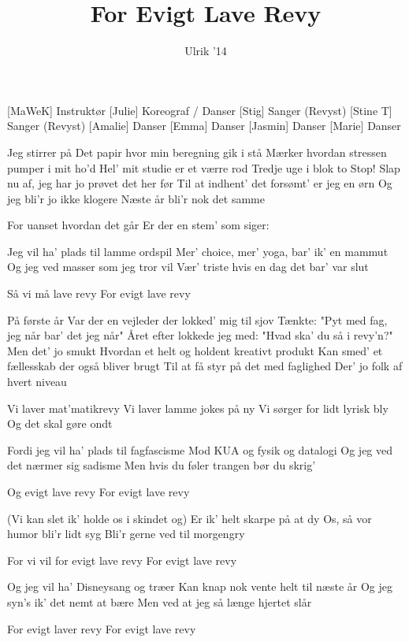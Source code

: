 \documentclass[a4paper,11pt]{article}
\title{For Evigt Lave Revy}
\author{Ulrik '14}
\begin{document}
\maketitle

\begin{roles}
[MaWeK] Instruktør
[Julie] Koreograf / Danser
[Stig] Sanger (Revyst)
[Stine T] Sanger (Revyst)
[Amalie] Danser
[Emma] Danser
[Jasmin] Danser
[Marie] Danser
\end{roles}

\begin{song}
 Jeg stirrer på
Det papir hvor min beregning gik i stå
Mærker hvordan stressen pumper i mit ho'd
Hel' mit studie er et værre rod
Tredje uge i blok to
Stop! Slap nu af, jeg har jo prøvet det her før
Til at indhent' det forsømt' er jeg en ørn
Og jeg bli'r jo ikke klogere
Næste år bli'r nok det samme

 For uanset hvordan det går
Er der en stem' som siger:

 Jeg vil ha' plads til lamme ordspil
Mer' choice, mer' yoga, bar' ik' en mammut
Og jeg ved masser som jeg tror vil
Vær' triste hvis en dag det bar' var slut

 Så vi må lave revy
For evigt lave revy

 På første år
Var der en vejleder der lokked' mig til sjov
Tænkte: "Pyt med fag, jeg når bar' det jeg når"
Året efter lokkede jeg med:
"Hvad ska' du så i revy'n?"
Men det' jo smukt
Hvordan et helt og holdent kreativt produkt
Kan smed' et fællesskab der også bliver brugt
Til at få styr på det med faglighed
Der' jo folk af hvert niveau

 Vi laver mat'matikrevy
Vi laver lamme jokes på ny
Vi sørger for lidt lyrisk bly
Og det skal gøre ondt

 Fordi jeg vil ha' plads til fagfascisme
Mod KUA og fysik og datalogi
Og jeg ved det nærmer sig sadisme
Men hvis du føler trangen bør du skrig'

 Og evigt lave revy
For evigt lave revy

 (Vi kan slet ik' holde os i skindet og)
Er ik' helt skarpe på at dy
Os, så vor humor bli'r lidt syg
Bli'r gerne ved til morgengry

 For vi vil for evigt lave revy
For evigt lave revy

 Og jeg vil ha' Disneysang og træer
Kan knap nok vente helt til næste år
Og jeg syn's ik' det nemt at bære
Men ved at jeg så længe hjertet slår

 For evigt laver revy
For evigt lave revy
\end{song}
\end{document}
